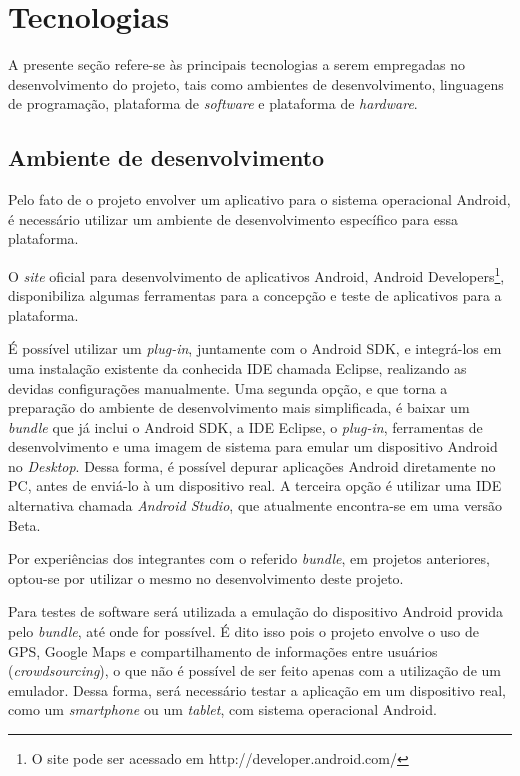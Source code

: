 
\section{Tecnologias}\label{s:tecnologias}

A presente seção refere-se às principais tecnologias a serem empregadas no desenvolvimento do projeto, tais como ambientes de desenvolvimento, linguagens de programação, plataforma de \textit{software} e plataforma de \textit{hardware}.

\subsection{Ambiente de desenvolvimento}

Pelo fato de o projeto envolver um aplicativo para o sistema operacional Android, é necessário utilizar um ambiente de desenvolvimento específico para essa plataforma.

O \emph{site} oficial para desenvolvimento de aplicativos Android, Android Developers\footnote{O site pode ser acessado em http://developer.android.com/}, disponibiliza algumas ferramentas para a concepção e teste de aplicativos para a plataforma.

É possível utilizar um \emph{plug-in}, juntamente com o Android SDK, e integrá-los em uma instalação existente da conhecida IDE chamada Eclipse, realizando as devidas configurações manualmente. Uma segunda opção, e que torna a preparação do ambiente de desenvolvimento mais simplificada, é baixar um \emph{bundle} que já inclui o Android SDK, a IDE Eclipse, o \emph{plug-in}, ferramentas de desenvolvimento e uma imagem de sistema para emular um dispositivo Android no \textit{Desktop}. Dessa forma, é possível depurar aplicações Android diretamente no PC, antes de enviá-lo à um dispositivo real. A terceira opção é utilizar uma IDE alternativa chamada \emph{Android Studio}, que atualmente encontra-se em uma versão Beta.

Por experiências dos integrantes com o referido \emph{bundle}, em projetos anteriores, optou-se por utilizar o mesmo no desenvolvimento deste projeto.

Para testes de software será utilizada a emulação do dispositivo Android provida pelo \emph{bundle}, até onde for possível. É dito isso pois o projeto envolve o uso de GPS, Google Maps e compartilhamento de informações entre usuários (\emph{crowdsourcing}), o que não é possível de ser feito apenas com a utilização de um emulador. Dessa forma, será necessário testar a aplicação em um dispositivo real, como um \emph{smartphone} ou um \emph{tablet}, com sistema operacional Android.

